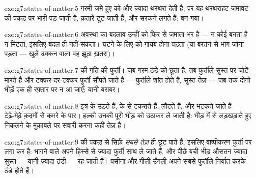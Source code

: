 \begin{solution}{exo:g7:states-of-matter:5}
गरमी जमे हुए  को और ज़्यादा थरथरा देती है;  पर यह थरथराहट
जमावट की पकड़ पर भारी पड़ जाती है, क़तारें टूट जाती हैं, और  सरकने
लगते हैं:   बन गया।
\end{solution}

\begin{solution}{exo:g7:states-of-matter:6}
अवस्था का बदलाव उन्हीं  को फिर से जमाता भर है --- न कोई बनता है न
मिटता, इसलिए  बदल ही नहीं सकता।  घटने के लिए 
को ग़ायब होना पड़ता (या बरतन से भाग जाना पड़ता --- खुले ढक्कन वाला वह
झूठा ख़तरा)।
\end{solution}

\begin{solution}{exo:g7:states-of-matter:7}
 की गति की फुर्ती। जब गरम ठंडे को छूता है, तब फुर्तीले  सुस्त
 पर चोटें मारते हैं और टक्कर-दर-टक्कर फुर्ती सौंपते जाते हैं ---
फुर्तीले शांत होते हैं, सुस्त तेज़ --- जब तक दोनों भीड़ें एक ही
रफ़्तार पर न आ जाएँ: यानी  बराबर।
\end{solution}

\begin{solution}{exo:g7:states-of-matter:8}
इत्र के  उड़ते हैं,  के  से टकराते हैं, लौटते हैं, और
भटकते जाते हैं --- टेढ़े-मेढ़े क़दमों से कमरे के पार। हल्की  उनकी
पूरी भीड़ को उठाकर ले जाती है: भीड़ में से लड़खड़ाते हुए निकलने के
मुक़ाबले  पर सवारी करना कहीं तेज़ है।
\end{solution}

\begin{solution}{exo:g7:states-of-matter:9}
 की पकड़ से सिर्फ़ \emph{सबसे तेज़}  ही छूट पाते हैं, इसलिए
वाष्पीकरण फुर्ती पर लगा कर है: भागने वाले अपने हिस्से से ज़्यादा फुर्ती
साथ ले जाते हैं, और पीछे बची भीड़ औसतन ज़्यादा सुस्त --- यानी ज़्यादा
ठंडी --- रह जाती है। पसीना और गीली उँगली अपने सबसे फुर्तीले  निर्यात
करके ठंडे होते हैं।
\end{solution}

